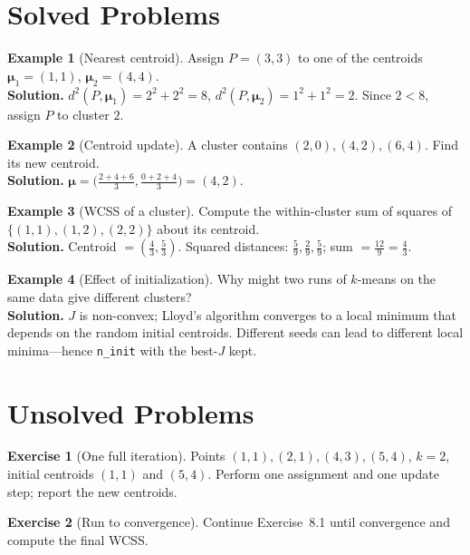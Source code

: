 \documentclass[11pt,a4paper]{report}
\theoremstyle{definition}
\newtheorem{example}{Example}[chapter]
\newtheorem{exercise}{Exercise}[chapter]
\theoremstyle{plain}
\theoremstyle{remark}
\newcommand{\vmu}{\bm{\mu}}
\begin{document}
	\section{Solved Problems}
	
	\begin{example}[Nearest centroid]
		Assign $P=(3,3)$ to one of the centroids $\vmu_1=(1,1)$, $\vmu_2=(4,4)$.\\
		\textbf{Solution.} $d^2(P,\vmu_1)=2^2+2^2=8$, $d^2(P,\vmu_2)=1^2+1^2=2$. Since
		$2<8$, assign $P$ to cluster $2$.
	\end{example}
	
	\begin{example}[Centroid update]
		A cluster contains $(2,0),(4,2),(6,4)$. Find its new centroid.\\
		\textbf{Solution.}
		$\vmu=\bigl(\tfrac{2+4+6}{3},\tfrac{0+2+4}{3}\bigr)=(4,2).$
	\end{example}
	
	\begin{example}[WCSS of a cluster]
		Compute the within-cluster sum of squares of $\{(1,1),(1,2),(2,2)\}$ about its
		centroid.\\
		\textbf{Solution.} Centroid $=(\tfrac43,\tfrac53)$. Squared distances:
		$\tfrac59,\tfrac29,\tfrac59$; sum $=\tfrac{12}{9}=\tfrac43$.
	\end{example}
	
	\begin{example}[Effect of initialization]
		Why might two runs of $k$-means on the same data give different clusters?\\
		\textbf{Solution.} $J$ is non-convex; Lloyd's algorithm converges to a local
		minimum that depends on the random initial centroids. Different seeds can lead
		to different local minima---hence \texttt{n\_init} with the best-$J$ kept.
	\end{example}
	
	\section{Unsolved Problems}
	
	\begin{exercise}[One full iteration]
		Points $(1,1),(2,1),(4,3),(5,4)$, $k=2$, initial centroids $(1,1)$ and $(5,4)$.
		Perform one assignment and one update step; report the new centroids.
	\end{exercise}
	
	\begin{exercise}[Run to convergence]
		Continue Exercise~8.1 until convergence and compute the final WCSS.
	\end{exercise}
	
\end{document}
